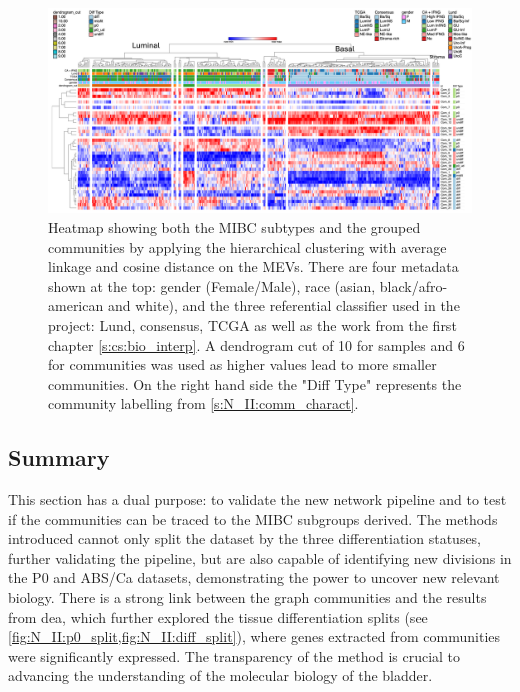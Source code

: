 \begin{figure}
    \includegraphics[width=1.0\textwidth,keepaspectratio]{Sections/Network_II/resources/non_tum/iMev_3_3_cs_13_horiz.png}
    
    \caption[Heatmap: MIBC subgroups derived from non-tumour network]{Heatmap showing both the MIBC subtypes and the grouped communities by applying the hierarchical clustering with average linkage and cosine distance on the MEVs. There are four metadata shown at the top: gender (Female/Male), race (asian, black/afro-american and white), and the three referential classifier used in the project: Lund, consensus, TCGA \citep{Marzouka2018-ge,Kamoun2020-tj,Robertson2017-mg} as well as the work from the first chapter \cref{s:cs:bio_interp}. A dendrogram cut of 10 for samples and 6 for communities was used as higher values lead to more smaller communities. On the right hand side the "Diff Type" represents the community labelling from \cref{s:N_II:comm_charact}.
    }
    \label{fig:N_II:tum_morph}
\end{figure}


\subsection{Summary}


This section has a dual purpose: to validate the new network pipeline and to test if the communities can be traced to the MIBC subgroups derived. The methods introduced cannot only split the dataset by the three differentiation statuses, further validating the pipeline, but are also capable of identifying new divisions in the P0 and ABS/Ca datasets, demonstrating the power to uncover new relevant biology. There is a strong link between the graph communities and the results from \acrlong{dea}, which further explored the tissue differentiation splits (see \cref{fig:N_II:p0_split,fig:N_II:diff_split}), where genes extracted from communities were significantly expressed. The transparency of the method is crucial to advancing the understanding of the molecular biology of the bladder.


